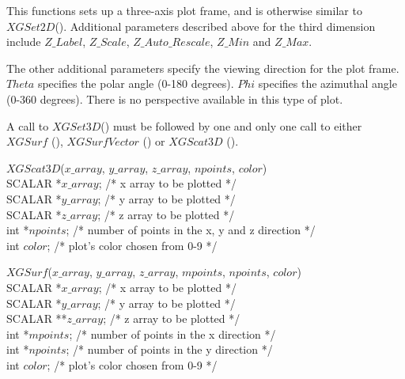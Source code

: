 This functions sets up a three-axis plot frame, and is otherwise similar to
$XGSet2D$().  Additional parameters described above for the third
dimension include $Z\_Label$, $Z\_Scale$, $Z\_Auto\_Rescale$, $Z\_Min$ and 
$Z\_Max$.

The other additional parameters specify the viewing direction for the plot
frame.  $Theta$ specifies the polar angle (0-180 degrees).  $Phi$ specifies
the azimuthal angle (0-360 degrees).  There is no perspective available in
this type of plot.

A call to $XGSet3D$() must be followed by one and only one call to
either $XGSurf$ (), $XGSurfVector$ () or $XGScat3D$ ().  

\begin{flushleft}
$XGScat3D$($x\_array$, $y\_array$, $z\_array$, $npoints$, $color$) \\
SCALAR   *$x\_array$;    /* x array to be plotted                         */ \\
SCALAR   *$y\_array$;    /* y array to be plotted                         */ \\
SCALAR   *$z\_array$;    /* z array to be plotted                         */ \\
int     *$npoints$;    /* number of points in the x, y and z direction   */ \\
int      $color$;      /* plot's color chosen from 0-9                   */
\end{flushleft}

\begin{flushleft}
$XGSurf$($x\_array$, $y\_array$, $z\_array$, $mpoints$, $npoints$, $color$) \\
SCALAR   *$x\_array$;    /* x array to be plotted                         */ \\
SCALAR   *$y\_array$;    /* y array to be plotted                         */ \\
SCALAR  **$z\_array$;    /* z array to be plotted                         */ \\
int     *$mpoints$;    /* number of points in the x direction            */ \\
int     *$npoints$;    /* number of points in the y direction            */ \\
int      $color$;      /* plot's color chosen from 0-9                   */
\end{flushleft}

